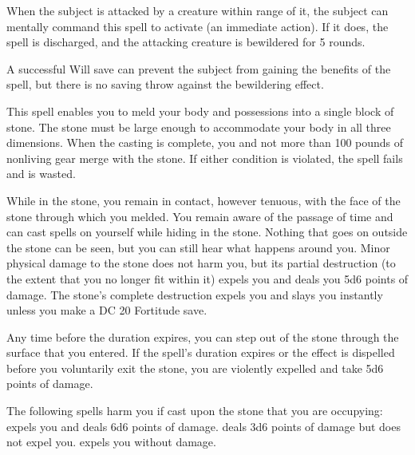 \begin{spelleffect}
    When the subject is attacked by a creature within \rngclose range of it, the subject can mentally command this spell to activate (an immediate action). If it does, the spell is discharged, and the attacking creature is bewildered for 5 rounds.
\end{spelleffect}
\begin{spellnotes}
    A successful Will save can prevent the subject from gaining the benefits of the spell, but there is no saving throw against the bewildering effect.
\end{spellnotes}

\spelldur{\durlong}
\begin{spelleffect}
  This spell enables you to meld your body and possessions into a single block of stone. The stone must be large enough to accommodate your body in all three dimensions. When the casting is complete, you and not more than 100 pounds of nonliving gear merge with the stone. If either condition is violated, the spell fails and is wasted.
  \par While in the stone, you remain in contact, however tenuous, with the face of the stone through which you melded. You remain aware of the passage of time and can cast spells on yourself while hiding in the stone. Nothing that goes on outside the stone can be seen, but you can still hear what happens around you. Minor physical damage to the stone does not harm you, but its partial destruction (to the extent that you no longer fit within it) expels you and deals you 5d6 points of damage. The stone's complete destruction expels you and slays you instantly unless you make a DC 20 Fortitude save.
  \par Any time before the duration expires, you can step out of the stone through the surface that you entered. If the spell's duration expires or the effect is dispelled before you voluntarily exit the stone, you are violently expelled and take 5d6 points of damage.
\end{spelleffect}
\begin{spellnotes}
  The following spells harm you if cast upon the stone that you are occupying:  expels you and deals 6d6 points of damage.  deals 3d6 points of damage but does not expel you.  expels you without damage.
\end{spellnotes}

